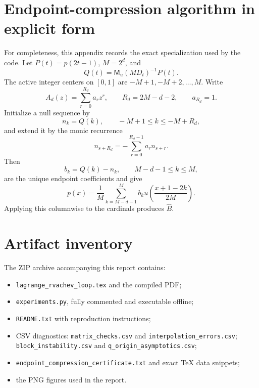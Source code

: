 \documentclass[11pt]{article}
\theoremstyle{definition}
\theoremstyle{remark}
\newcommand{\MM}{\mathsf M}
\begin{document}
\section{Endpoint-compression algorithm in explicit form}
\label{app:compression}

For completeness, this appendix records the exact specialization used by the
code.  Let $P(t)=p(2t-1)$, $M=2^d$, and
\[
 Q(t)=\MM_u(MD_t)^{-1}P(t).
\]
The active integer centers on $[0,1]$ are
$-M+1,-M+2,\ldots,M$.  Write
\[
 A_d(z)=\sum_{r=0}^{R_d}a_rz^r,
 \qquad R_d=2M-d-2,
 \qquad a_{R_d}=1.
\]
Initialize a null sequence by
\[
 n_k=Q(k),
 \qquad -M+1\le k\le -M+R_d,
\]
and extend it by the monic recurrence
\begin{equation}
 n_{s+R_d}=-\sum_{r=0}^{R_d-1}a_rn_{s+r}.
 \label{eq:null-recurrence}
\end{equation}
Then
\[
 b_k=Q(k)-n_k,
 \qquad M-d-1\le k\le M,
\]
are the unique endpoint coefficients and give
\[
 p(x)=\frac1M\sum_{k=M-d-1}^{M}b_k
 u\!\left(\frac{x+1-2k}{2M}\right).
\]
Applying this columnwise to the cardinals produces $\widehat B$.

\section{Artifact inventory}
\label{app:inventory}

The ZIP archive accompanying this report contains:
\begin{itemize}
  \item \texttt{lagrange\_rvachev\_loop.tex} and the compiled PDF;
  \item \texttt{experiments.py}, fully commented and executable offline;
  \item \texttt{README.txt} with reproduction instructions;
  \item CSV diagnostics: \texttt{matrix\_checks.csv} and
  \texttt{interpolation\_errors.csv};\\[-0.15em]
  \texttt{block\_instability.csv} and
  \texttt{q\_origin\_asymptotics.csv};
  \item \texttt{endpoint\_compression\_certificate.txt} and exact TeX data
  snippets;
  \item the PNG figures used in the report.
\end{itemize}
\end{document}
